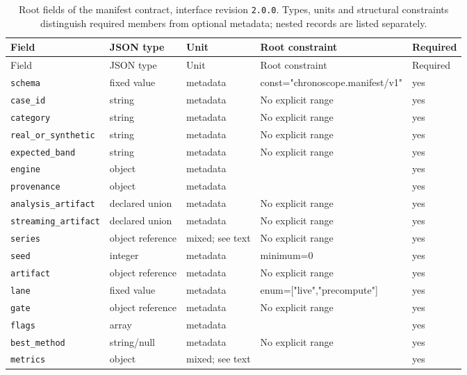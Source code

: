 \begingroup\small
\begin{longtable}{@{}p{}p{}p{}p{}p{}@{}}
\caption{Root fields of the manifest contract, interface revision \texttt{2.0.0}. Types, units and structural constraints distinguish required members from optional metadata; nested records are listed separately.}\label{tab:contract-manifest}\\
\toprule Field & JSON type & Unit & Root constraint & Required\\\midrule\endfirsthead
\toprule Field & JSON type & Unit & Root constraint & Required\\\midrule\endhead
\texttt{schema} & fixed value & metadata & const="chronosco\allowbreak{}pe.manifest/v1" & yes\\
\texttt{case\_\allowbreak{}id} & string & metadata & No explicit range & yes\\
\texttt{category} & string & metadata & No explicit range & yes\\
\texttt{real\_\allowbreak{}or\_\allowbreak{}synthetic} & string & metadata & No explicit range & yes\\
\texttt{expected\_\allowbreak{}band} & string & metadata & No explicit range & yes\\
\texttt{engine} & object & metadata &  & yes\\
\texttt{provenance} & object & metadata &  & yes\\
\texttt{analysis\_\allowbreak{}artifact} & declared union & metadata & No explicit range & yes\\
\texttt{streaming\_\allowbreak{}artifact} & declared union & metadata & No explicit range & yes\\
\texttt{series} & object reference & mixed; see text & No explicit range & yes\\
\texttt{seed} & integer & metadata & minimum=0 & yes\\
\texttt{artifact} & object reference & metadata & No explicit range & yes\\
\texttt{lane} & fixed value & metadata & enum=["live","pr\allowbreak{}ecompute"] & yes\\
\texttt{gate} & object reference & metadata & No explicit range & yes\\
\texttt{flags} & array & metadata &  & yes\\
\texttt{best\_\allowbreak{}method} & string/null & metadata & No explicit range & yes\\
\texttt{metrics} & object & mixed; see text &  & yes\\
\bottomrule
\end{longtable}
\endgroup
